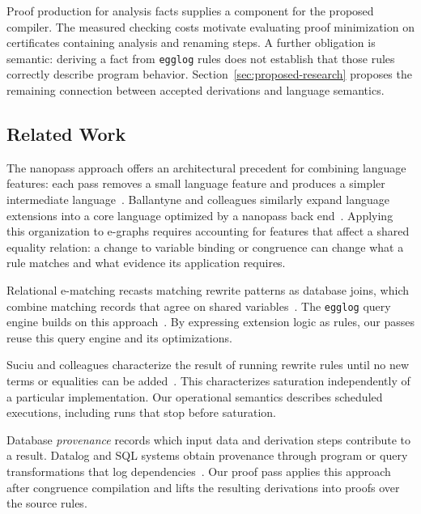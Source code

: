 Proof production for analysis facts supplies a component for the proposed compiler.
The measured checking costs motivate evaluating proof minimization
  on certificates containing analysis and renaming steps.
A further obligation is semantic: deriving a fact from \texttt{egglog} rules
  does not establish that those rules correctly describe program behavior.
Section~\ref{sec:proposed-research} proposes the remaining connection
  between accepted derivations and language semantics.

\subsection{Related Work}
\label{sec:related-extensions}

The nanopass approach offers an architectural precedent for combining language features:
  each pass removes a small language feature and produces a simpler intermediate language~\cite{nanopass}.
Ballantyne and colleagues similarly expand language extensions into a core language
  optimized by a nanopass back end~\cite{nanopass2}.
Applying this organization to e-graphs requires accounting for features
  that affect a shared equality relation:
  a change to variable binding or congruence can change what a rule matches
  and what evidence its application requires.

Relational e-matching recasts matching rewrite patterns as database joins,
  which combine matching records that agree on shared variables~\cite{relational-ematching}.
The \texttt{egglog} query engine builds on this approach~\cite{egglog}.
By expressing extension logic as rules, our passes reuse this query engine
  and its optimizations.

Suciu and colleagues characterize the result of running rewrite rules
  until no new terms or equalities can be added~\cite{semantic-foundations}.
This characterizes saturation independently of a particular implementation.
Our operational semantics describes scheduled executions,
  including runs that stop before saturation.

Database \emph{provenance} records which input data and derivation steps contribute to a result.
Datalog and SQL systems obtain provenance through program or query transformations
  that log dependencies~\cite{datalog-debugging,exspan,provsql}.
Our proof pass applies this approach after congruence compilation
  and lifts the resulting derivations into proofs over the source rules.

